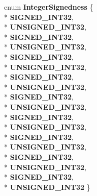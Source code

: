 \begin{DoxyCompactItemize}
\item 
enum {\bfseries Integer\+Signedness} \{ \\*
{\bfseries S\+I\+G\+N\+E\+D\+\_\+\+I\+N\+T32}, 
\\*
{\bfseries U\+N\+S\+I\+G\+N\+E\+D\+\_\+\+I\+N\+T32}, 
\\*
{\bfseries S\+I\+G\+N\+E\+D\+\_\+\+I\+N\+T32}, 
\\*
{\bfseries U\+N\+S\+I\+G\+N\+E\+D\+\_\+\+I\+N\+T32}, 
\\*
{\bfseries S\+I\+G\+N\+E\+D\+\_\+\+I\+N\+T32}, 
\\*
{\bfseries U\+N\+S\+I\+G\+N\+E\+D\+\_\+\+I\+N\+T32}, 
\\*
{\bfseries S\+I\+G\+N\+E\+D\+\_\+\+I\+N\+T32}, 
\\*
{\bfseries U\+N\+S\+I\+G\+N\+E\+D\+\_\+\+I\+N\+T32}, 
\\*
{\bfseries S\+I\+G\+N\+E\+D\+\_\+\+I\+N\+T32}, 
\\*
{\bfseries U\+N\+S\+I\+G\+N\+E\+D\+\_\+\+I\+N\+T32}, 
\\*
{\bfseries S\+I\+G\+N\+E\+D\+\_\+\+I\+N\+T32}, 
\\*
{\bfseries U\+N\+S\+I\+G\+N\+E\+D\+\_\+\+I\+N\+T32}, 
\\*
{\bfseries S\+I\+G\+N\+E\+D\+\_\+\+I\+N\+T32}, 
\\*
{\bfseries U\+N\+S\+I\+G\+N\+E\+D\+\_\+\+I\+N\+T32}, 
\\*
{\bfseries S\+I\+G\+N\+E\+D\+\_\+\+I\+N\+T32}, 
\\*
{\bfseries U\+N\+S\+I\+G\+N\+E\+D\+\_\+\+I\+N\+T32}, 
\\*
{\bfseries S\+I\+G\+N\+E\+D\+\_\+\+I\+N\+T32}, 
\\*
{\bfseries U\+N\+S\+I\+G\+N\+E\+D\+\_\+\+I\+N\+T32}
 \}\hypertarget{classv8_1_1internal_1_1_l_code_gen_a29a982d57fb7548092bffc62539543b6}{}\label{classv8_1_1internal_1_1_l_code_gen_a29a982d57fb7548092bffc62539543b6}

\end{DoxyCompactItemize}
